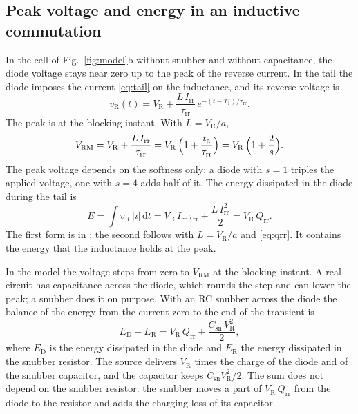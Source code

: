 \documentclass[10pt,a4paper]{scrartcl}
\newcommand{\VR}{V_\mathrm{R}}
\newcommand{\Irr}{I_\mathrm{rr}}
\newcommand{\Qrr}{Q_\mathrm{rr}}
\newcommand{\ta}{t_\mathrm{a}}
\newcommand{\taurr}{\tau_\mathrm{rr}}
\newcommand{\Tone}{T_1}
\newcommand{\Csn}{C_\mathrm{sn}}
\newcommand{\Vrm}{V_\mathrm{RM}}
\newcommand{\diff}{\mathrm{d}}
\begin{document}
\subsection{Peak voltage and energy in an inductive commutation}
\label{sec:energy}
In the cell of Fig.~\ref{fig:model}b without snubber and without capacitance, the diode voltage stays near zero up to the peak of the reverse current. In the tail the diode imposes the current \eqref{eq:tail} on the inductance, and its reverse voltage is
\begin{equation}
v_\mathrm{R}(t) = \VR + \frac{L\,\Irr}{\taurr}\,e^{-(t-\Tone)/\taurr} .
\end{equation}
The peak is at the blocking instant. With $L = \VR/a$,
\begin{equation}
\Vrm = \VR + \frac{L\,\Irr}{\taurr} = \VR\,\Bigl(1 + \frac{\ta}{\taurr}\Bigr) = \VR\,\Bigl(1 + \frac{2}{s}\Bigr) .
\label{eq:vrm}
\end{equation}
The peak voltage depends on the softness only: a diode with $s = 1$ triples the applied voltage, one with $s = 4$ adds half of it. The energy dissipated in the diode during the tail is
\begin{equation}
E = \int v_\mathrm{R}\,|i|\,\diff t = \VR\,\Irr\,\taurr + \frac{L\,\Irr^2}{2} = \VR\,\Qrr .
\label{eq:erec}
\end{equation}
The first form is in \cite{mathworks}; the second follows with $L = \VR/a$ and \eqref{eq:qrr}. It contains the energy that the inductance holds at the peak.

In the model the voltage steps from zero to $\Vrm$ at the blocking instant. A real circuit has capacitance across the diode, which rounds the step and can lower the peak; a snubber does it on purpose. With an RC snubber across the diode the balance of the energy from the current zero to the end of the transient is
\begin{equation}
E_\mathrm{D} + E_\mathrm{R} = \VR\,\Qrr + \frac{\Csn\,\VR^2}{2} ,
\label{eq:ebal}
\end{equation}
where $E_\mathrm{D}$ is the energy dissipated in the diode and $E_\mathrm{R}$ the energy dissipated in the snubber resistor. The source delivers $\VR$ times the charge of the diode and of the snubber capacitor, and the capacitor keeps $\Csn\VR^2/2$. The sum does not depend on the snubber resistor: the snubber moves a part of $\VR\,\Qrr$ from the diode to the resistor and adds the charging loss of its capacitor.
\end{document}
